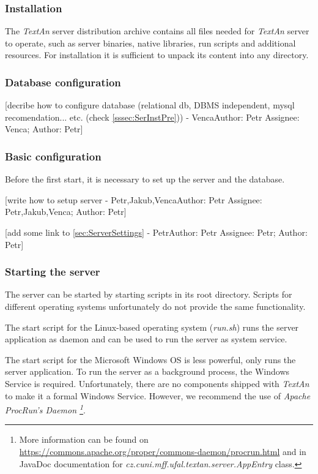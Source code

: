 \documentclass[12pt,a4paper]{report}
\makeatletter
\newcommand{\comment}[3][\@empty]{
  {\color{magenta}[#3 - }
  {\color{green}\ifx\@empty#1\relax Author: #2 \else Assignee: #1; Author: #2\fi}{\color{magenta}]}
}
\newcommand{\textan}{\emph{TextAn}}
\makeatother
\begin{document}
\subsubsection{Installation}

The \textan{} server distribution archive contains all files needed for \textan{} server to operate,
such as server binaries, native libraries, run scripts and additional resources.
For installation it is sufficient to unpack its content into any directory.

\subsubsection{Database configuration}
\comment[Venca]{Petr}{decribe how to configure database (relational db, DBMS
independent, mysql recomendation... etc. (check \ref{sssec:SerInstPre}))}

\subsubsection{Basic configuration}

Before the first start, it is necessary to set up the server and the database.

\comment[Petr,Jakub,Venca]{Petr}{write how to setup server}

\comment[Petr]{Petr}{add some link to \ref{sec:ServerSettings}}

\subsubsection{Starting the server}

The server can be started by starting scripts in its root directory. Scripts for
different operating systems unfortunately do not provide the same functionality.

The start script for the Linux-based operating system (\emph{run.sh}) runs the
server application as daemon and can be used to run the server as system service.

The start script for the Microsoft Windows OS is less powerful, only runs the
server application. To run the server as a background process, the Windows Service
is required. Unfortunately, there are no components shipped with \textan{}
to make it a formal Windows Service. However, we recommend the use of \emph{Apache
ProcRun's Daemon \footnote{More information can be found on
\url{https://commons.apache.org/proper/commons-daemon/procrun.html} and in JavaDoc
documentation for \emph{cz.cuni.mff.ufal.textan.server.AppEntry} class.}}.
\end{document}

